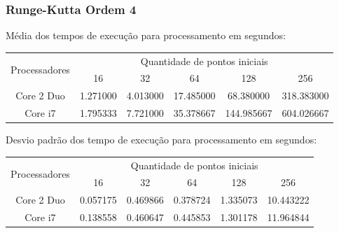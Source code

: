    \subsubsection{Runge-Kutta Ordem 4} 
    Média dos tempos de execução para processamento em segundos:\\
    \begin{scriptsize}
    \begin{tabular}{| c | c | c | c | c | c |}
      \hline
      \multirow{2}{*}{Processadores}& \multicolumn{5}{|c|}{Quantidade de pontos iniciais} \\ \cline{2-6}
      & 16 & 32 & 64 & 128 & 256 \\ \hline
      Core 2 Duo & 1.271000 & 4.013000 & 17.485000 & 68.380000 & 318.383000 \\ \hline
      Core i7 & 1.795333 & 7.721000 & 35.378667 & 144.985667 & 604.026667\\ \hline

      \hline
    \end{tabular}
    \end{scriptsize}
    
    \hspace{1mm}\newline
    
    \noindent Desvio padrão dos tempo de execução para processamento em segundos:\\
    \begin{scriptsize}
    \begin{tabular}{| c | c | c | c | c | c |}
      \hline
      \multirow{2}{*}{Processadores}& \multicolumn{5}{|c|}{Quantidade de pontos iniciais} \\ \cline{2-6}
      & 16 & 32 & 64 & 128 & 256 \\ \hline
      Core 2 Duo & 0.057175 & 0.469866 & 0.378724 & 1.335073 & 10.443222 \\ \hline
      Core i7 & 0.138558 & 0.460647 & 0.445853 & 1.301178 & 11.964844 \\ \hline

      \hline
    \end{tabular}
    \end{scriptsize}
    
    \hspace{1mm}\newline
    
